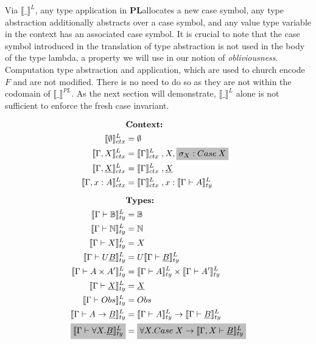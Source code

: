 \documentclass[acmsmall]{acmart}
\newcommand{\den}[1]{\llbracket #1\rrbracket}
\newcommand{\denLty}[1]{\den{#1}^L_{ty}}
\newcommand{\pl}{$\mathbf{PL}$}
\begin{document}
Via $\den{\_}^L$, any type application in \pl\;allocates a new case symbol, any type abstraction additionally abstracts over a case symbol, and any value type variable in the context has an associated case symbol. It is crucial to note that the case symbol introduced in the translation of type abstraction is not used in the body of the type lambda, a property we will use in our notion of \textit{obliviousness}. Computation type abstraction and application, which are used to church encode $F$ and are not modified. There is no need to do so as they are not within the codomain of $\den{\_}^{PL}$. As the next section will demonstrate, $\den{\_}^L$ alone is not sufficient to enforce the fresh case invariant. 


\begin{figure}[H]
  \centering
  \scriptsize
  \begin{minipage}[t]{0.48\textwidth}
    \[
    \begin{aligned}
      &\textbf{Context:} \\
      \den{\emptyset }^L_{ctx} &= \emptyset \\
      \den{\Gamma,X  }^L_{ctx} &= \den{\Gamma }^L_{ctx} \;, X,\colorbox{lightgray}{$\sigma_X: Case\:X$} \\
      \den{\Gamma,\underline{X}  }^L_{ctx} &= \den{\Gamma }^L_{ctx}\; , \underline{X} \\
      \den{\Gamma, x : A }^L_{ctx} &= \den{\Gamma }^L_{ctx}\; , x : \den{\Gamma \vdash A}^L_{ty} \\[0.5em]
      &\textbf{Types:} \\
      \denLty{\Gamma \vdash \mathbb{B}} &= \mathbb{B} \\
      \denLty{\Gamma \vdash \mathbb{N}} &= \mathbb{N} \\
      \denLty{\Gamma \vdash X} &= X \\
      \denLty{\Gamma \vdash U\underline{B}} &= U \denLty{\Gamma \vdash \underline{B}} \\
      \denLty{\Gamma \vdash A \times A'} &= \denLty{\Gamma \vdash A} \times \denLty{\Gamma \vdash A'} \\
      \denLty{\Gamma \vdash \underline{X}} &= \underline{X} \\
      \denLty{\Gamma \vdash Obs} &= Obs \\
      \denLty{\Gamma \vdash A \rightarrow \underline{B}} &= \denLty{\Gamma \vdash A} \rightarrow \denLty{\Gamma \vdash \underline{B}} \\
      \colorbox{lightgray}{$\denLty{\Gamma \vdash \forall X . \underline{B}}$} &= \colorbox{lightgray}{$\forall X. Case \;X \rightarrow \denLty{\Gamma,X \vdash \underline{B}}$} \\

\end{aligned}\]
\end{minipage}
\end{figure}
\end{document}
